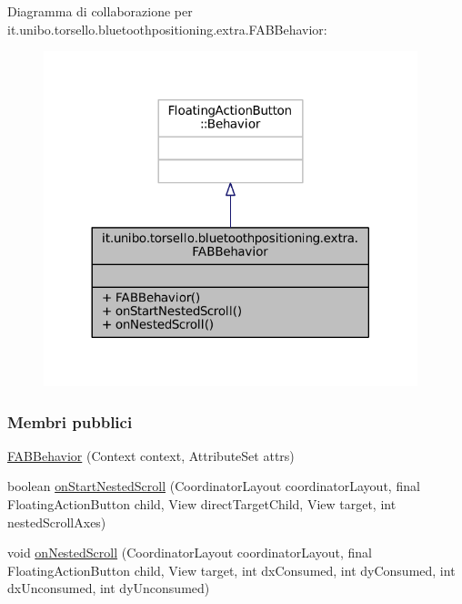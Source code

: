 Diagramma di collaborazione per it.\+unibo.\+torsello.\+bluetoothpositioning.\+extra.\+F\+A\+B\+Behavior\+:
\nopagebreak
\begin{figure}[H]
\begin{center}
\leavevmode
\includegraphics[width=308pt]{classit_1_1unibo_1_1torsello_1_1bluetoothpositioning_1_1extra_1_1FABBehavior__coll__graph}
\end{center}
\end{figure}
\subsubsection*{Membri pubblici}
\begin{DoxyCompactItemize}
\item 
\hyperlink{classit_1_1unibo_1_1torsello_1_1bluetoothpositioning_1_1extra_1_1FABBehavior_ae703e3a3d6d647561f7b41a0eb94a9f0_ae703e3a3d6d647561f7b41a0eb94a9f0}{F\+A\+B\+Behavior} (Context context, Attribute\+Set attrs)
\item 
boolean \hyperlink{classit_1_1unibo_1_1torsello_1_1bluetoothpositioning_1_1extra_1_1FABBehavior_a5c6501a08ec79dd6bd92106b72c14979_a5c6501a08ec79dd6bd92106b72c14979}{on\+Start\+Nested\+Scroll} (Coordinator\+Layout coordinator\+Layout, final Floating\+Action\+Button child, View direct\+Target\+Child, View target, int nested\+Scroll\+Axes)
\item 
void \hyperlink{classit_1_1unibo_1_1torsello_1_1bluetoothpositioning_1_1extra_1_1FABBehavior_ab4208eb2a50a8e79e0a80089f398a5b9_ab4208eb2a50a8e79e0a80089f398a5b9}{on\+Nested\+Scroll} (Coordinator\+Layout coordinator\+Layout, final Floating\+Action\+Button child, View target, int dx\+Consumed, int dy\+Consumed, int dx\+Unconsumed, int dy\+Unconsumed)
\end{DoxyCompactItemize}


